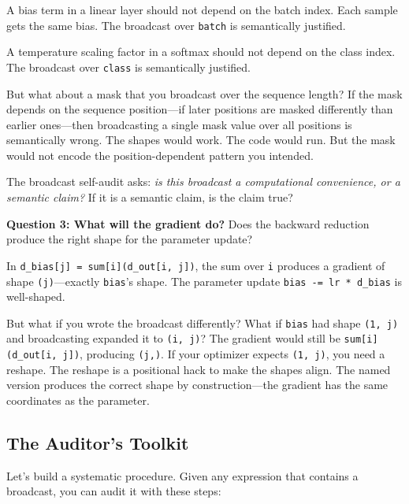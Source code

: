 \documentclass[11pt,titlepage]{article}
\begin{document}
A bias term in a linear layer should not depend on the batch index. Each
sample gets the same bias. The broadcast over \texttt{batch} is
semantically justified.

A temperature scaling factor in a softmax should not depend on the class
index. The broadcast over \texttt{class} is semantically justified.

But what about a mask that you broadcast over the sequence length? If
the mask depends on the sequence position---if later positions are
masked differently than earlier ones---then broadcasting a single mask
value over all positions is semantically wrong. The shapes would work.
The code would run. But the mask would not encode the position-dependent
pattern you intended.

The broadcast self-audit asks: \emph{is this broadcast a computational
convenience, or a semantic claim?} If it is a semantic claim, is the
claim true?

\textbf{Question 3: What will the gradient do?} Does the backward
reduction produce the right shape for the parameter update?

In \texttt{d\_bias{[}j{]}\ =\ sum{[}i{]}(d\_out{[}i,\ j{]})}, the sum
over \texttt{i} produces a gradient of shape \texttt{(j)}---exactly
\texttt{bias}'s shape. The parameter update
\texttt{bias\ -=\ lr\ *\ d\_bias} is well-shaped.

But what if you wrote the broadcast differently? What if \texttt{bias}
had shape \texttt{(1,\ j)} and broadcasting expanded it to
\texttt{(i,\ j)}? The gradient would still be
\texttt{sum{[}i{]}(d\_out{[}i,\ j{]})}, producing \texttt{(j,)}. If your
optimizer expects \texttt{(1,\ j)}, you need a reshape. The reshape is a
positional hack to make the shapes align. The named version produces the
correct shape by construction---the gradient has the same coordinates as
the parameter.

\vspace{2em}

\hypertarget{the-auditors-toolkit}{%
\subsection{The Auditor's Toolkit}\label{the-auditors-toolkit}}

Let's build a systematic procedure. Given any expression that contains a
broadcast, you can audit it with these steps:
\end{document}
